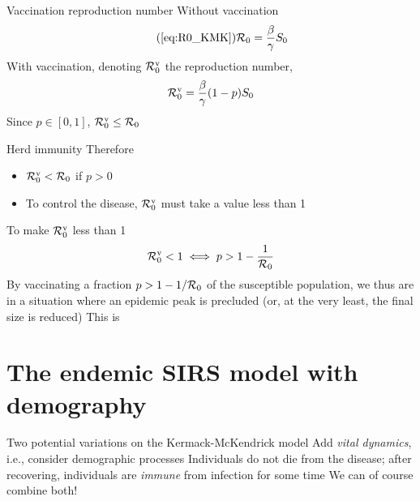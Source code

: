 \documentclass[aspectratio=43]{beamer}
\begin{document}
\begin{frame}{Vaccination reproduction number}
  Without vaccination
  \begin{equation}\tag{\ref{eq:R0_KMK}}
    \R_0=\frac{\beta}{\gamma}S_0
  \end{equation}
  \vfill
  With vaccination, denoting $\mathcal{R}_0^{\text{v}}$ the reproduction number,
  \begin{equation}
    \mathcal{R}_0^{\text{v}} = \frac{\beta}{\gamma}(1-p)S_0
  \end{equation}
  \vfill
  Since $p\in[0,1]$, $\mathcal{R}_0^{\text{v}}\leq\mathcal{R}_0$
\end{frame}


\begin{frame}{Herd immunity}
  Therefore
  \begin{itemize}
    \item $\mathcal{R}_0^{\textrm{v}}<\mathcal{R}_0$ if $p>0$ 
    \item To control the disease, $\mathcal{R}_0^{\text{v}}$ must take a value less than 1
  \end{itemize}
  \vfill
To make $\mathcal{R}_0^{\text{v}}$ less than 1
  \begin{equation}\label{eq:herd_immunity}
    \mathcal{R}_0^{\text{v}}<1 \iff p> 1-\frac{1}{\mathcal{R}_0}
  \end{equation}
  \vfill
  By vaccinating a fraction $p>1-1/\mathcal{R}_0$ of the susceptible population, we thus are in a situation where an epidemic peak is precluded (or, at the very least, the final size is reduced)
  \vfill
  This is 
\end{frame}







\section{The endemic SIRS model with demography}


\begin{frame}{Two potential variations on the Kermack-McKendrick model}
\bbullet Add \emph{vital dynamics}, i.e., consider demographic processes
\vfill
\bbullet Individuals do not die from the disease; after recovering, individuals are \emph{immune} from infection for some time
\vfill
\bbullet We can of course combine both!
\end{frame}
\end{document}
